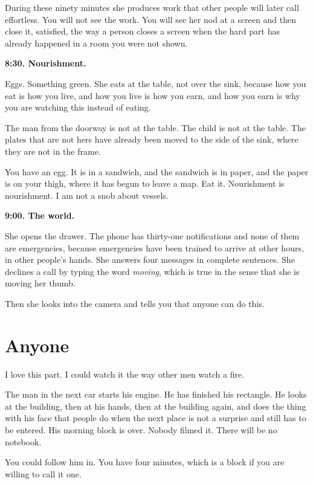 \documentclass[11pt,oneside]{book}
\begin{document}
During these ninety minutes she produces work that other people will later call effortless. You will not see the work. You will see her nod at a screen and then close it, satisfied, the way a person closes a screen when the hard part has already happened in a room you were not shown.

\textbf{8:30. Nourishment.}

Eggs. Something green. She eats at the table, not over the sink, because how you eat is how you live, and how you live is how you earn, and how you earn is why you are watching this instead of eating.

The man from the doorway is not at the table. The child is not at the table. The plates that are not hers have already been moved to the side of the sink, where they are not in the frame.

You have an egg. It is in a sandwich, and the sandwich is in paper, and the paper is on your thigh, where it has begun to leave a map. Eat it. Nourishment is nourishment. I am not a snob about vessels.

\textbf{9:00. The world.}

She opens the drawer. The phone has thirty-one notifications and none of them are emergencies, because emergencies have been trained to arrive at other hours, in other people's hands. She answers four messages in complete sentences. She declines a call by typing the word \emph{moving}, which is true in the sense that she is moving her thumb.

Then she looks into the camera and tells you that anyone can do this.

\section*{Anyone}

I love this part. I could watch it the way other men watch a fire.

The man in the next car starts his engine. He has finished his rectangle. He looks at the building, then at his hands, then at the building again, and does the thing with his face that people do when the next place is not a surprise and still has to be entered. His morning block is over. Nobody filmed it. There will be no notebook.

You could follow him in. You have four minutes, which is a block if you are willing to call it one.
\end{document}
